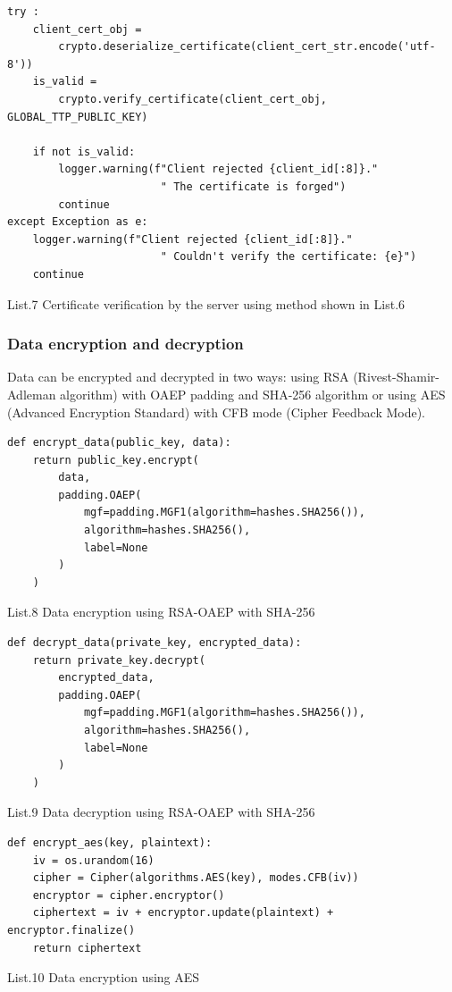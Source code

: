 \documentclass[12pt, a4paper]{report}
\begin{document}
\begin{verbatim}
try :
    client_cert_obj =
        crypto.deserialize_certificate(client_cert_str.encode('utf-8'))
    is_valid =
        crypto.verify_certificate(client_cert_obj, GLOBAL_TTP_PUBLIC_KEY)

    if not is_valid:
        logger.warning(f"Client rejected {client_id[:8]}."
                        " The certificate is forged")
        continue
except Exception as e:
    logger.warning(f"Client rejected {client_id[:8]}."
                        " Couldn't verify the certificate: {e}")
    continue
\end{verbatim}
\begin{center}
List.7 Certificate verification by the server using method shown in List.6
\end{center}

\subsubsection{Data encryption and decryption}

Data can be encrypted and decrypted in two ways: using RSA (Rivest-Shamir-Adleman algorithm) with OAEP padding and SHA-256 algorithm or using AES (Advanced Encryption Standard) with CFB mode (Cipher Feedback Mode).

\begin{verbatim}
def encrypt_data(public_key, data):
    return public_key.encrypt(
        data,
        padding.OAEP(
            mgf=padding.MGF1(algorithm=hashes.SHA256()),
            algorithm=hashes.SHA256(),
            label=None
        )
    )
\end{verbatim}
\begin{center}
List.8 Data encryption using RSA-OAEP with SHA-256
\end{center}

\newpage

\begin{verbatim}
def decrypt_data(private_key, encrypted_data):
    return private_key.decrypt(
        encrypted_data,
        padding.OAEP(
            mgf=padding.MGF1(algorithm=hashes.SHA256()),
            algorithm=hashes.SHA256(),
            label=None
        )
    )
\end{verbatim}
\begin{center}
List.9 Data decryption using RSA-OAEP with SHA-256
\end{center}

\begin{verbatim}
def encrypt_aes(key, plaintext):
    iv = os.urandom(16)
    cipher = Cipher(algorithms.AES(key), modes.CFB(iv))
    encryptor = cipher.encryptor()
    ciphertext = iv + encryptor.update(plaintext) + encryptor.finalize()
    return ciphertext
\end{verbatim}
\begin{center}
List.10 Data encryption using AES
\end{center}
\end{document}
